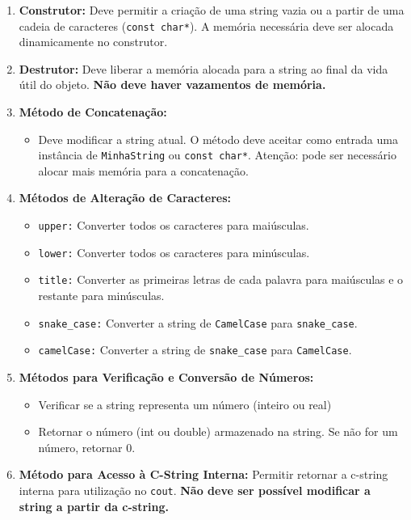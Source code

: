 \documentclass[12pt]{article}
\begin{document}
\begin{enumerate}[label=\textbf{\arabic*.}]
    \item \textbf{Construtor:}  Deve permitir a criação de uma string vazia ou a partir de uma cadeia de caracteres (\texttt{const char*}). A memória necessária deve ser alocada dinamicamente no construtor.
    
    
    \item \textbf{Destrutor:} Deve liberar a memória alocada para a string ao final da vida útil do objeto. \textbf{Não deve haver vazamentos de memória.}
    
    \item \textbf{Método de Concatenação:} 
    \begin{itemize}
        \item Deve modificar a string atual. O método deve aceitar como entrada uma instância de \texttt{MinhaString} ou \texttt{const char*}. Atenção: pode ser necessário alocar mais memória para a concatenação.
    \end{itemize}
    
    \item \textbf{Métodos de Alteração de Caracteres:} 
    \begin{itemize}
        \item \texttt{upper:} Converter todos os caracteres para maiúsculas.
        \item \texttt{lower:} Converter todos os caracteres para minúsculas.
        \item \texttt{title:} Converter as primeiras letras de cada palavra para maiúsculas e o restante para minúsculas.
        \item \texttt{snake\_case:} Converter a string de \texttt{CamelCase} para \texttt{snake\_case}.
        \item \texttt{camelCase:} Converter a string de \texttt{snake\_case} para \texttt{CamelCase}.
    \end{itemize}
    
    \item \textbf{Métodos para Verificação e Conversão de Números:} 
    \begin{itemize}
        \item Verificar se a string representa um número (inteiro ou real)
        \item Retornar o número (int ou double) armazenado na string. Se não for um número, retornar 0.
    \end{itemize}
    
    \item \textbf{Método para Acesso à C-String Interna:} Permitir retornar a c-string interna para utilização no \texttt{cout}. \textbf{Não deve ser possível modificar a string a partir da c-string.}
\end{enumerate}
\end{document}
